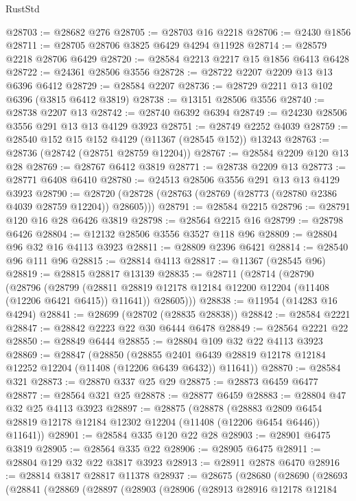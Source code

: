 \begin{lexlean}{RustStd}
\begin{coremodule}
@28703 := @28682 @276
@28705 := @28703 @16 @2218
@28706 := @2430 @1856
@28711 := @28705 @28706 @3825 @6429 @4294 @11928
@28714 := @28579 @2218 @28706 @6429
@28720 := @28584 @2213 @2217 @15 @1856 @6413 @6428
@28722 := @24361 @28506 @3556
@28728 := @28722 @2207 @2209 @13 @13 @6396 @6412
@28729 := @28584 @2207
@28736 := @28729 @2211 @13 @102 @6396 (@3815 @6412 @3819)
@28738 := @13151 @28506 @3556
@28740 := @28738 @2207 @13
@28742 := @28740 @6392 @6394
@28749 := @24230 @28506 @3556 @291 @13 @13 @4129 @3923
@28751 := @28749 @2252 @4039
@28759 := @28540 @152 @15 @152 @4129 (@11367 (@28545 @152)) @13243
@28763 := @28736 (@28742 (@28751 @28759 @12204))
@28767 := @28584 @2209 @120 @13 @28
@28769 := @28767 @6412 @3819
@28771 := @28738 @2209 @13
@28773 := @28771 @6408 @6410
@28780 := @24513 @28506 @3556 @291 @13 @13 @4129 @3923
@28790 := @28720 (@28728 (@28763 (@28769 (@28773 (@28780 @2386 @4039 @28759 @12204)) @28605)))
@28791 := @28584 @2215
@28796 := @28791 @120 @16 @28 @6426 @3819
@28798 := @28564 @2215 @16
@28799 := @28798 @6426
@28804 := @12132 @28506 @3556 @3527 @118 @96
@28809 := @28804 @96 @32 @16 @4113 @3923
@28811 := @28809 @2396 @6421
@28814 := @28540 @96 @111 @96
@28815 := @28814 @4113
@28817 := @11367 (@28545 @96)
@28819 := @28815 @28817 @13139
@28835 := @28711
    (@28714
      (@28790
        (@28796
          (@28799 (@28811 @28819 @12178 @12184 @12200 @12204 (@11408 (@12206 @6421 @6415)) @11641))
          @28605)))
@28838 := @11954 (@14283 @16 @4294)
@28841 := @28699 (@28702 (@28835 @28838))
@28842 := @28584 @2221
@28847 := @28842 @2223 @22 @30 @6444 @6478
@28849 := @28564 @2221 @22
@28850 := @28849 @6444
@28855 := @28804 @109 @32 @22 @4113 @3923
@28869 := @28847
    (@28850
      (@28855 @2401 @6439 @28819 @12178 @12184 @12252 @12204 (@11408 (@12206 @6439 @6432)) @11641))
@28870 := @28584 @321
@28873 := @28870 @337 @25 @29
@28875 := @28873 @6459 @6477
@28877 := @28564 @321 @25
@28878 := @28877 @6459
@28883 := @28804 @47 @32 @25 @4113 @3923
@28897 := @28875
    (@28878
      (@28883 @2809 @6454 @28819 @12178 @12184 @12302 @12204 (@11408 (@12206 @6454 @6446)) @11641))
@28901 := @28584 @335 @120 @22 @28
@28903 := @28901 @6475 @3819
@28905 := @28564 @335 @22
@28906 := @28905 @6475
@28911 := @28804 @129 @32 @22 @3817 @3923
@28913 := @28911 @2878 @6470
@28916 := @28814 @3817 @28817 @11378
@28937 := @28675
    (@28680
      (@28690
        (@28693
          (@28841
            (@28869
              (@28897
                (@28903
                  (@28906
                    (@28913
                      @28916
                      @12178
                      @12184

\end{coremodule}
\end{lexlean}
